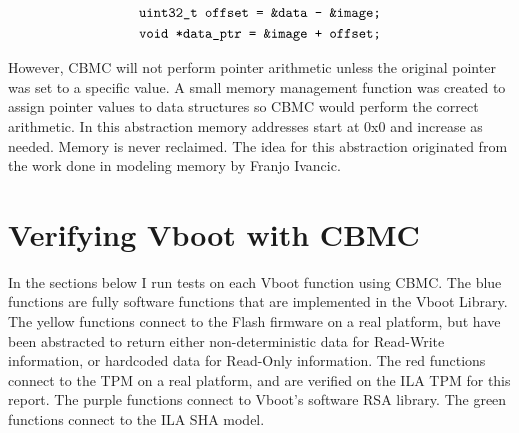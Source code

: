 \begin{equation} \label{eq:ptr}
\begin{split}
    \texttt{uint32\_t offset = \&data - \&image;} \\
    \texttt{void *data\_ptr = \&image + offset;} 
\end{split}
\end{equation}

However, CBMC will not perform pointer arithmetic unless the original pointer
was set to a specific value.
A small memory management function was created to assign pointer values to data
structures so CBMC would perform the correct arithmetic.
In this abstraction memory addresses start at 0x0 and increase as needed.
Memory is never reclaimed.
The idea for this abstraction originated from the work done in modeling memory
by Franjo Ivancic\cite{eff-model-check}.

% 

\section{Verifying Vboot with CBMC}

In the sections below I run tests on each Vboot function using CBMC\@.
The blue functions are fully software functions that are implemented in the Vboot Library.
The yellow functions connect to the Flash firmware on a real platform, but have been abstracted to return either non-deterministic data for Read-Write information, or hardcoded data for Read-Only information.
The red functions connect to the TPM on a real platform, and are verified on the
ILA TPM for this report.
The purple functions connect to Vboot's software RSA library. 
The green functions connect to the ILA SHA model. 

